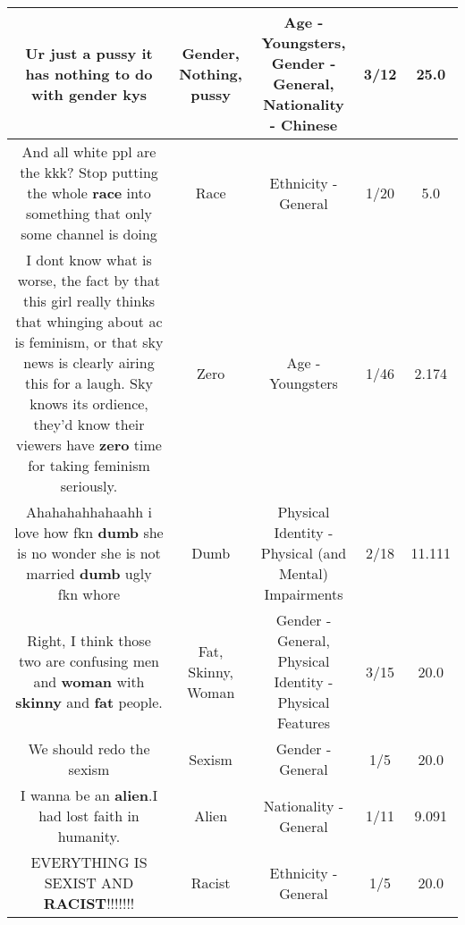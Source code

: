 \documentclass[11pt]{article}
\newlength\mylength
\begin{document}
\begin{center}
\begin{longtable}{|C{.65\mylength}|C{.30\mylength}|C{.12\mylength}|C{.12\mylength}|C{.12\mylength}|}
  \small Ur just a \textbf{pussy} it has \textbf{nothing} to do with \textbf{gender} kys\normalsize   & Gender, Nothing, pussy & Age - Youngsters, Gender - General, Nationality - Chinese & 3/12 & 25.0 \\  \hline
  \small And all white ppl are the kkk? Stop putting the whole \textbf{race} into something that only some channel is doing\normalsize   & Race & Ethnicity - General & 1/20 & 5.0 \\  \hline
  \small I dont know what is worse, the fact by that this girl really thinks that whinging about ac is feminism, or that sky news is clearly airing this for a laugh. Sky knows its ordience, they'd know their viewers have \textbf{zero} time for taking feminism seriously.\normalsize   & Zero & Age - Youngsters & 1/46 & 2.174 \\  \hline
  \small Ahahahahhahaahh i love how fkn \textbf{dumb} she is no wonder she is not married \textbf{dumb} ugly fkn whore\normalsize   & Dumb & Physical Identity - Physical (and Mental) Impairments & 2/18 & 11.111 \\  \hline
  \small Right, I think those two are confusing men and \textbf{woman} with \textbf{skinny} and \textbf{fat} people.\normalsize   & Fat, Skinny, Woman & Gender - General, Physical Identity - Physical Features & 3/15 & 20.0 \\  \hline
  \small We should redo the sexism\normalsize   & Sexism & Gender - General & 1/5 & 20.0 \\  \hline
  \small I wanna be an \textbf{alien}.I had lost faith in humanity.\normalsize   & Alien & Nationality - General & 1/11 & 9.091 \\  \hline
  \small EVERYTHING IS SEXIST AND \textbf{RACIST}!!!!!!!\normalsize   & Racist & Ethnicity - General & 1/5 & 20.0 \\  \hline

\end{longtable}
\end{center}
\end{document}

